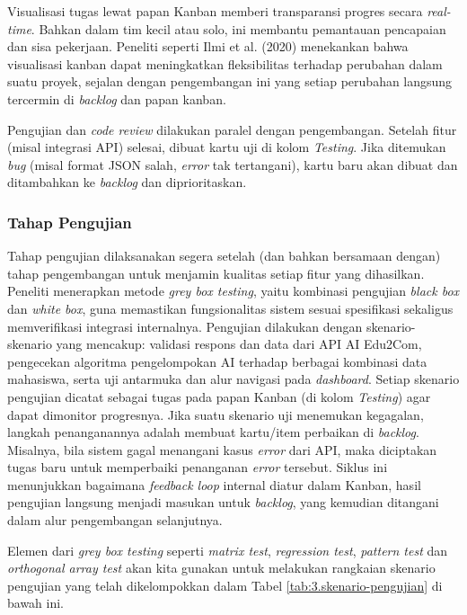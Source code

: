 Visualisasi tugas lewat papan Kanban memberi transparansi progres secara \textit{real-time}. Bahkan dalam tim kecil atau solo, ini membantu pemantauan pencapaian dan sisa pekerjaan. Peneliti seperti Ilmi et al. (2020) menekankan bahwa visualisasi kanban dapat meningkatkan fleksibilitas terhadap perubahan dalam suatu proyek, sejalan dengan pengembangan ini yang setiap perubahan langsung tercermin di \textit{backlog} dan papan kanban.

Pengujian dan \textit{code review} dilakukan paralel dengan pengembangan. Setelah fitur (misal integrasi API) selesai, dibuat kartu uji di kolom \textit{Testing}. Jika ditemukan \textit{bug} (misal format JSON salah, \textit{error} tak tertangani), kartu baru akan dibuat dan ditambahkan ke \textit{backlog} dan diprioritaskan.

\subsubsection{Tahap Pengujian}

Tahap pengujian dilaksanakan segera setelah (dan bahkan bersamaan dengan) tahap pengembangan untuk menjamin kualitas setiap fitur yang dihasilkan. Peneliti menerapkan metode \textit{grey box testing}, yaitu kombinasi pengujian \textit{black box} dan \textit{white box}, guna memastikan fungsionalitas sistem sesuai spesifikasi sekaligus memverifikasi integrasi internalnya. Pengujian dilakukan dengan skenario-skenario yang mencakup: validasi respons dan data dari API AI Edu2Com, pengecekan algoritma pengelompokan AI terhadap berbagai kombinasi data mahasiswa, serta uji antarmuka dan alur navigasi pada \textit{dashboard}. Setiap skenario pengujian dicatat sebagai tugas pada papan Kanban (di kolom \textit{Testing}) agar dapat dimonitor progresnya. Jika suatu skenario uji menemukan kegagalan, langkah penanganannya adalah membuat kartu/item perbaikan di \textit{backlog}. Misalnya, bila sistem gagal menangani kasus \textit{error} dari API, maka diciptakan tugas baru untuk memperbaiki penanganan \textit{error} tersebut. Siklus ini menunjukkan bagaimana \textit{feedback loop} internal diatur dalam Kanban, hasil pengujian langsung menjadi masukan untuk \textit{backlog}, yang kemudian ditangani dalam alur pengembangan selanjutnya.

Elemen dari \textit{grey box testing} seperti \textit{matrix test}, \textit{regression test}, \textit{pattern test} dan \textit{orthogonal array test} akan kita gunakan untuk melakukan rangkaian skenario pengujian yang telah dikelompokkan dalam Tabel \ref{tab:3.skenario-pengujian} di bawah ini.

